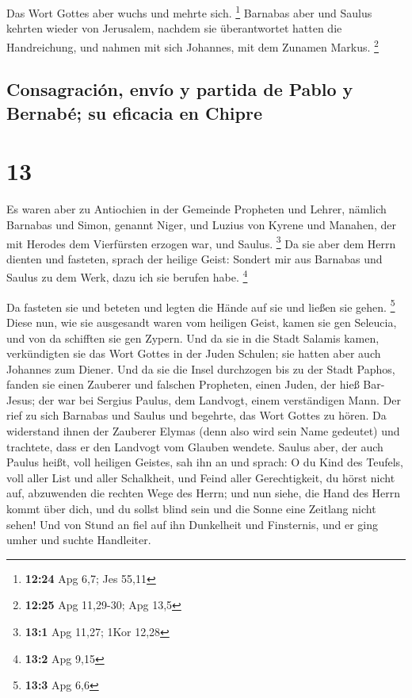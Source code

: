  Das Wort Gottes aber wuchs und mehrte sich. \footnote{\textbf{12:24}
  Apg 6,7; Jes 55,11}  Barnabas aber und Saulus kehrten
wieder von Jerusalem, nachdem sie überantwortet hatten die Handreichung,
und nahmen mit sich Johannes, mit dem Zunamen Markus. \footnote{\textbf{12:25}
  Apg 11,29-30; Apg 13,5}

\hypertarget{consagraciuxf3n-envuxedo-y-partida-de-pablo-y-bernabuxe9-su-eficacia-en-chipre}{%
\subsection{Consagración, envío y partida de Pablo y Bernabé; su
eficacia en
Chipre}\label{consagraciuxf3n-envuxedo-y-partida-de-pablo-y-bernabuxe9-su-eficacia-en-chipre}}

\hypertarget{section-12}{%
\section{13}\label{section-12}}

 Es waren aber zu Antiochien in der Gemeinde Propheten und
Lehrer, nämlich Barnabas und Simon, genannt Niger, und Luzius von Kyrene
und Manahen, der mit Herodes dem Vierfürsten erzogen war, und Saulus.
\footnote{\textbf{13:1} Apg 11,27; 1Kor 12,28}  Da sie
aber dem Herrn dienten und fasteten, sprach der heilige Geist: Sondert
mir aus Barnabas und Saulus zu dem Werk, dazu ich sie berufen habe.
\footnote{\textbf{13:2} Apg 9,15}

 Da fasteten sie und beteten und legten die Hände auf sie
und ließen sie gehen. \footnote{\textbf{13:3} Apg 6,6} 
Diese nun, wie sie ausgesandt waren vom heiligen Geist, kamen sie gen
Seleucia, und von da schifften sie gen Zypern.  Und da sie
in die Stadt Salamis kamen, verkündigten sie das Wort Gottes in der
Juden Schulen; sie hatten aber auch Johannes zum Diener. 
Und da sie die Insel durchzogen bis zu der Stadt Paphos, fanden sie
einen Zauberer und falschen Propheten, einen Juden, der hieß Bar-Jesus;
 der war bei Sergius Paulus, dem Landvogt, einem
verständigen Mann. Der rief zu sich Barnabas und Saulus und begehrte,
das Wort Gottes zu hören.  Da widerstand ihnen der
Zauberer Elymas (denn also wird sein Name gedeutet) und trachtete, dass
er den Landvogt vom Glauben wendete.  Saulus aber, der
auch Paulus heißt, voll heiligen Geistes, sah ihn an  und
sprach: O du Kind des Teufels, voll aller List und aller Schalkheit, und
Feind aller Gerechtigkeit, du hörst nicht auf, abzuwenden die rechten
Wege des Herrn;  und nun siehe, die Hand des Herrn kommt
über dich, und du sollst blind sein und die Sonne eine Zeitlang nicht
sehen! Und von Stund an fiel auf ihn Dunkelheit und Finsternis, und er
ging umher und suchte Handleiter.

